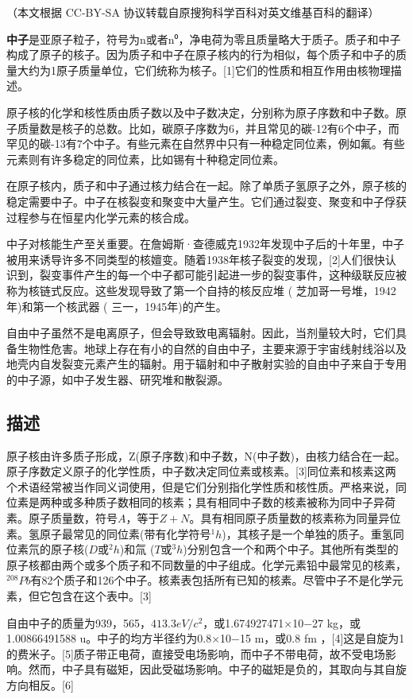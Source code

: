 
（本文根据 CC-BY-SA 协议转载自原搜狗科学百科对英文维基百科的翻译）

\textbf{中子}是亚原子粒子，符号为n或者n⁰，净电荷为零且质量略大于质子。质子和中子构成了原子的核子。因为质子和中子在原子核内的行为相似，每个质子和中子的质量大约为1原子质量单位，它们统称为核子。[1]它们的性质和相互作用由核物理描述。

原子核的化学和核性质由质子数以及中子数决定，分别称为原子序数和中子数。原子质量数是核子的总数。比如，碳原子序数为6，并且常见的碳-12有6个中子，而罕见的碳-13有7个中子。有些元素在自然界中只有一种稳定同位素，例如氟。有些元素则有许多稳定的同位素，比如锡有十种稳定同位素。

在原子核内，质子和中子通过核力结合在一起。除了单质子氢原子之外，原子核的稳定需要中子。中子在核裂变和聚变中大量产生。它们通过裂变、聚变和中子俘获过程参与在恒星内化学元素的核合成。

中子对核能生产至关重要。在詹姆斯·查德威克1932年发现中子后的十年里，中子被用来诱导许多不同类型的核嬗变。随着1938年核子裂变的发现，[2]人们很快认识到，裂变事件产生的每一个中子都可能引起进一步的裂变事件，这种级联反应被称为核链式反应。这些发现导致了第一个自持的核反应堆 ( 芝加哥一号堆，1942年)和第一个核武器 ( 三一，1945年)的产生。

自由中子虽然不是电离原子，但会导致致电离辐射。因此，当剂量较大时，它们具备生物性危害。地球上存在有小的自然的自由中子，主要来源于宇宙线射线浴以及地壳内自发裂变元素产生的辐射。用于辐射和中子散射实验的自由中子来自于专用的中子源，如中子发生器、研究堆和散裂源。

\subsection{描述}
原子核由许多质子形成，Z(原子序数)和中子数，N(中子数)，由核力结合在一起。原子序数定义原子的化学性质，中子数决定同位素或核素。[3]同位素和核素这两个术语经常被当作同义词使用，但是它们分别指化学性质和核性质。严格来说，同位素是两种或多种质子数相同的核素；具有相同中子数的核素被称为同中子异荷素。原子质量数，符号$A$，等于$Z+N$。具有相同原子质量数的核素称为同量异位素。氢原子最常见的同位素(带有化学符号$^1h$)，其核子是一个单独的质子。重氢同位素氘的原子核($D$或$^2h$)和氚 ($T$或$^3h$)分别包含一个和两个中子。其他所有类型的原子核都由两个或多个质子和不同数量的中子组成。化学元素铅中最常见的核素，$^{208}Pb$有82个质子和126个中子。核素表包括所有已知的核素。尽管中子不是化学元素，但它包含在这个表中。[3]

自由中子的质量为939，565，$413.3 eV /c^2$，或1.674927471×10−27 kg，或1.00866491588 u。中子的均方半径约为0.8×10−15 m，或0.8 fm ，[4]这是自旋为1的费米子。[5]质子带正电荷，直接受电场影响，而中子不带电荷，故不受电场影响。然而，中子具有磁矩，因此受磁场影响。中子的磁矩是负的，其取向与其自旋方向相反。[6]



















